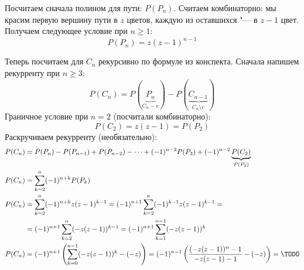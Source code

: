 	Посчитаем сначала полином для пути: $P(P_n)$.
	Считаем комбинаторно: мы красим первую вершину пути в $z$ цветов, каждую из оставшихся "--- в $z-1$ цвет.
	Получаем следующее условие при $n \ge 1$:
	\[
		P(P_n) = z(z-1)^{n-1}
	\]

	Теперь посчитаем для $C_n$ рекурсивно по формуле из конспекта.
	Сначала напишем рекурренту при $n \ge 3$:
	\[
		P(C_n) = P(\underbrace{P_n}_{C_n - e}) - P(\underbrace{C_{n-1}}_{C_n\setminus e})
	\]
	Граничное условие при $n = 2$ (посчитали комбинаторно):
	\[ P(C_2)=z(z-1)=P(P_2) \]
	Раскручиваем рекурренту (необязательно):
	\begin{align*}
		P(C_n) &= P(P_n) - P(P_{n-1}) + P(P_{n-2}) - \dots + (-1)^{n-3}P(P_3) + (-1)^{n-2}\underbrace{P(C_2)}_{P(P_2)} \\
		P(C_n) &= \sum_{k=2}^n (-1)^{n+k}P(P_k) \\
		P(C_n) &=
			\sum_{k=2}^n (-1)^{n+k}z(z-1)^{k-1} =
			(-1)^{n+1}\sum_{k=2}^n (-1)^{k-1}z(z-1)^{k-1} = \\
		&=	(-1)^{n+1}\sum_{k=2}^n (-z(z-1))^{k-1} =
			(-1)^{n+1}\sum_{k=1}^{n-1} (-z(z-1))^{k} \\
		P(C_n) &=
			(-1)^{n+1}\left(\sum_{k=0}^{n-1} (-z(z-1))^{k} - (-z)\right) =
			(-1)^{n-1}\left(\frac{(-z(z-1))^n-1}{-z(z-1)-1} - (-z)\right) = \TODO \\
	\end{align*}

